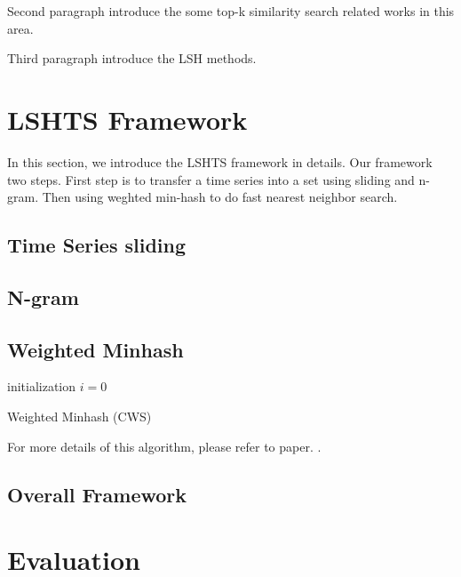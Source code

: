 \documentclass{article}
\begin{document}
Second paragraph introduce the some top-k similarity search related works in this area.

Third paragraph introduce the LSH methods.


\section{LSHTS Framework}
In this section, we introduce the LSHTS framework in details. Our framework two steps. First step is to transfer a time series into a set using sliding and n-gram.
Then using weghted min-hash to do fast nearest neighbor search.

\subsection {Time Series sliding}

\subsection {N-gram}

\subsection {Weighted Minhash}

\begin{algorithm}[h]
	initialization $i=0$\;
	\caption{Weighted Minhash (CWS)}
\end{algorithm}

For more details of this algorithm, please refer to paper. \cite{ioffe2010improved}. 

\subsection{Overall Framework}

\section{Evaluation}
\end{document}
